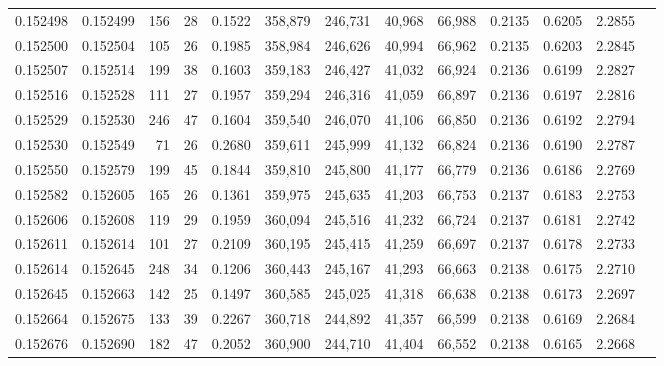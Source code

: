 \begin{tabular}{rrrrrrrrrrrrr}
0.152498 & 0.152499 &   156 &  28 &                                     0.1522 & 358,879 & 246,731 &  40,968 &  66,988 & 0.2135 & 0.6205 & 2.2855 \\
0.152500 & 0.152504 &   105 &  26 &                                     0.1985 & 358,984 & 246,626 &  40,994 &  66,962 & 0.2135 & 0.6203 & 2.2845 \\
0.152507 & 0.152514 &   199 &  38 &                                     0.1603 & 359,183 & 246,427 &  41,032 &  66,924 & 0.2136 & 0.6199 & 2.2827 \\
0.152516 & 0.152528 &   111 &  27 &                                     0.1957 & 359,294 & 246,316 &  41,059 &  66,897 & 0.2136 & 0.6197 & 2.2816 \\
0.152529 & 0.152530 &   246 &  47 &                                     0.1604 & 359,540 & 246,070 &  41,106 &  66,850 & 0.2136 & 0.6192 & 2.2794 \\
0.152530 & 0.152549 &    71 &  26 &                                     0.2680 & 359,611 & 245,999 &  41,132 &  66,824 & 0.2136 & 0.6190 & 2.2787 \\
0.152550 & 0.152579 &   199 &  45 &                                     0.1844 & 359,810 & 245,800 &  41,177 &  66,779 & 0.2136 & 0.6186 & 2.2769 \\
0.152582 & 0.152605 &   165 &  26 &                                     0.1361 & 359,975 & 245,635 &  41,203 &  66,753 & 0.2137 & 0.6183 & 2.2753 \\
0.152606 & 0.152608 &   119 &  29 &                                     0.1959 & 360,094 & 245,516 &  41,232 &  66,724 & 0.2137 & 0.6181 & 2.2742 \\
0.152611 & 0.152614 &   101 &  27 &                                     0.2109 & 360,195 & 245,415 &  41,259 &  66,697 & 0.2137 & 0.6178 & 2.2733 \\
0.152614 & 0.152645 &   248 &  34 &                                     0.1206 & 360,443 & 245,167 &  41,293 &  66,663 & 0.2138 & 0.6175 & 2.2710 \\
0.152645 & 0.152663 &   142 &  25 &                                     0.1497 & 360,585 & 245,025 &  41,318 &  66,638 & 0.2138 & 0.6173 & 2.2697 \\
0.152664 & 0.152675 &   133 &  39 &                                     0.2267 & 360,718 & 244,892 &  41,357 &  66,599 & 0.2138 & 0.6169 & 2.2684 \\
0.152676 & 0.152690 &   182 &  47 &                                     0.2052 & 360,900 & 244,710 &  41,404 &  66,552 & 0.2138 & 0.6165 & 2.2668 \\

\end{tabular}
